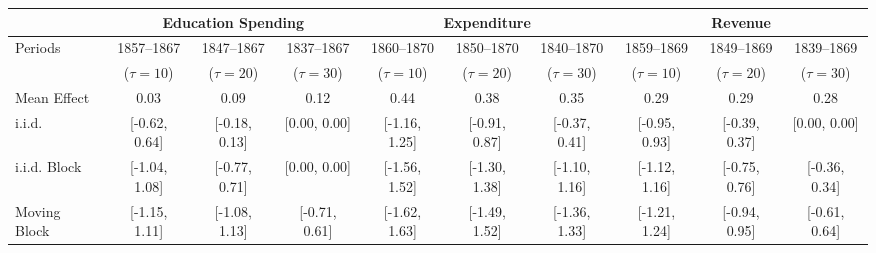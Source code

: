 \begin{tabular}{@{}lccccccccc@{}}
		\toprule
		 & \multicolumn{3}{c}{Education Spending}        & \multicolumn{3}{c}{Expenditure}            & \multicolumn{3}{c}{Revenue}                \\ \midrule
Periods	 & 1857--1867     & 1847--1867      & 1837--1867      & 1860--1870     & 1850--1870     & 1840--1870  	  & 1859--1869      & 1849--1869   	  & 1839--1869   \\
	 	 & ($\tau = 10$)  & ($\tau = 20$)   & ($\tau = 30$)   & ($\tau = 10$)  & ($\tau = 20$)  & ($\tau = 30$)   &  ($\tau = 10$)  &  ($\tau = 20$)  &  ($\tau = 30$)  \\
		\hline
		Mean Effect                       	   &   0.03        & 	0.09       & 	0.12       &       0.44   &   0.38	     & 	0.35	    & 	0.29       &   0.29       & 	0.28\\
		i.i.d.                      		   & [-0.62, 0.64]  & [-0.18, 0.13]  & [0.00, 0.00]  & [-1.16, 1.25] & [-0.91, 0.87] & [-0.37, 0.41] & [-0.95, 0.93] & [-0.39, 0.37] & [0.00, 0.00] \\
		i.i.d. Block                        & [-1.04, 1.08]  & [-0.77, 0.71]  & [0.00, 0.00]  & [-1.56, 1.52] & [-1.30, 1.38] & [-1.10, 1.16] & [-1.12, 1.16] & [-0.75, 0.76] & [-0.36, 0.34] \\
		Moving Block                        & [-1.15, 1.11]  & [-1.08, 1.13]  & [-0.71, 0.61]  & [-1.62, 1.63] & [-1.49, 1.52] & [-1.36, 1.33] & [-1.21, 1.24] & [-0.94, 0.95] & [-0.61, 0.64] \\ \bottomrule
\end{tabular}
